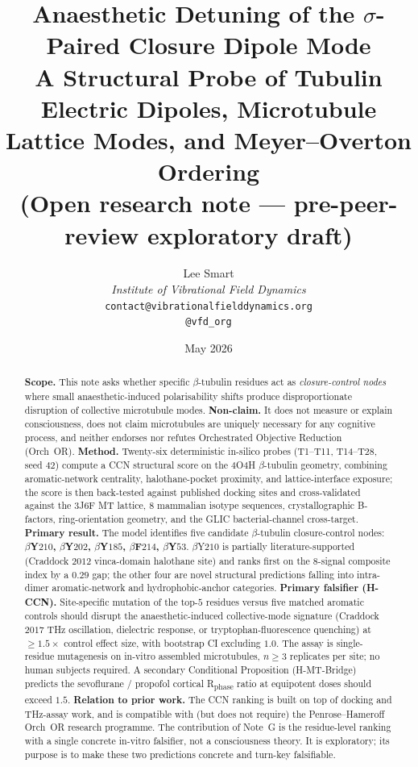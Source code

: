 \documentclass[11pt,a4paper]{article}
\title{\textbf{Anaesthetic Detuning of the $\sigma$-Paired Closure Dipole Mode}\\[2pt]
\large A Structural Probe of Tubulin Electric Dipoles, Microtubule Lattice Modes, and Meyer--Overton Ordering\\[1pt]
\small (Open research note --- pre-peer-review exploratory draft)}
\author{%
  Lee Smart\\[4pt]
  \textit{Institute of Vibrational Field Dynamics}\\[2pt]
  \texttt{contact@vibrationalfielddynamics.org}\\[2pt]
  \texttt{@vfd\_org}%
}
\date{May 2026}
\begin{document}
\maketitle
\thispagestyle{empty}

\begin{abstract}
\noindent
\textbf{Scope.} This note asks whether specific $\beta$-tubulin residues
act as \emph{closure-control nodes} where small anaesthetic-induced
polarisability shifts produce disproportionate disruption of collective
microtubule modes. \textbf{Non-claim.} It does not measure or explain
consciousness, does not claim microtubules are uniquely necessary for
any cognitive process, and neither endorses nor refutes Orchestrated
Objective Reduction (Orch~OR). \textbf{Method.} Twenty-six deterministic
in-silico probes (\textsf{T1}--\textsf{T11}, \textsf{T14}--\textsf{T28},
seed $42$) compute a CCN structural score on the $4$O$4$H $\beta$-tubulin
geometry, combining aromatic-network centrality, halothane-pocket
proximity, and lattice-interface exposure; the score is then
back-tested against published \citet{Craddock2012} docking sites and
cross-validated against the $3$J$6$F MT lattice, $8$ mammalian isotype
sequences, crystallographic B-factors, ring-orientation geometry, and
the GLIC bacterial-channel cross-target.
\textbf{Primary result.} The model identifies five candidate
$\beta$-tubulin closure-control nodes:
\textbf{$\beta$Y$210$, $\beta$Y$202$, $\beta$Y$185$, $\beta$F$214$,
$\beta$Y$53$}. $\beta$Y$210$ is partially literature-supported (Craddock
$2012$ vinca-domain halothane site) and ranks first on the $8$-signal
composite index by a $0.29$ gap; the other four are novel structural
predictions falling into intra-dimer aromatic-network and
hydrophobic-anchor categories.
\textbf{Primary falsifier (H-CCN).} Site-specific mutation of the
top-$5$ residues versus five matched aromatic controls should disrupt
the anaesthetic-induced collective-mode signature (Craddock $2017$ THz
oscillation, dielectric response, or tryptophan-fluorescence quenching)
at $\geq 1.5\times$ control effect size, with bootstrap CI excluding
$1.0$. The assay is single-residue mutagenesis on in-vitro assembled
microtubules, $n \geq 3$ replicates per site; no human subjects required.
A secondary Conditional Proposition (H-MT-Bridge) predicts the
sevoflurane / propofol cortical R\textsubscript{phase} ratio at
equipotent doses should exceed $1.5$.
\textbf{Relation to prior work.} The CCN ranking is built on top of
\citet{Craddock2012} docking and \citet{Craddock2017} THz-assay
work, and is compatible with (but does not require) the
Penrose--Hameroff Orch~OR research programme. The contribution of
Note~G is the residue-level ranking with a single concrete in-vitro
falsifier, not a consciousness theory. It is exploratory; its purpose
is to make these two
predictions concrete and turn-key falsifiable.
\end{abstract}
\end{document}
